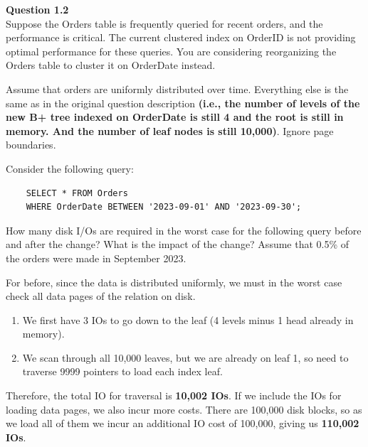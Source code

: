 \begin{example}
    \vspace{1em}
    \noindent\textbf{Question 1.2}\\
    Suppose the Orders table is frequently queried for recent orders, and the performance is critical. The current clustered index on OrderID is not providing optimal performance for these queries. You are considering reorganizing the Orders table to cluster it on OrderDate instead.

    Assume that orders are uniformly distributed over time. Everything else is the same as in the original question description \textbf{(i.e., the number of levels of the new B+ tree indexed on OrderDate is still 4 and the root is still in memory. And the number of leaf nodes is still 10,000)}. Ignore page boundaries.

    Consider the following query:
    \begin{lstlisting}
    SELECT * FROM Orders 
    WHERE OrderDate BETWEEN '2023-09-01' AND '2023-09-30';
    \end{lstlisting}

    How many disk I/Os are required in the worst case for the following query before and after the change? What is the impact of the change? Assume that 0.5\% of the orders were made in September 2023.

    For before, since the data is distributed uniformly, we must in the worst case check all data pages of the relation on disk. 
    \begin{enumerate}
      \item We first have 3 IOs to go down to the leaf (4 levels minus 1 head already in memory). 
      \item We scan through all 10,000 leaves, but we are already on leaf 1, so need to traverse 9999 pointers to load each index leaf. 
    \end{enumerate}
    Therefore, the total IO for traversal is \textbf{10,002 IOs}. If we include the IOs for loading data pages, we also incur more costs. There are 100,000 disk blocks, so as we load all of them we incur an additional IO cost of 100,000, giving us \textbf{110,002 IOs}. 



\end{example}
